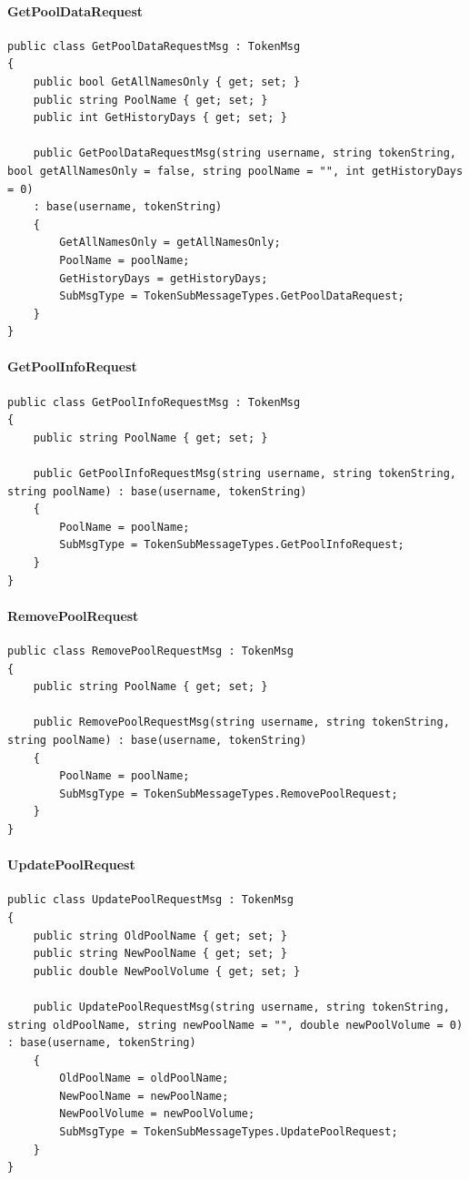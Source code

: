 \paragraph{GetPoolDataRequest}
\begin{lstlisting}[caption=GetPoolDataRequest, label=code:GetPoolDataRequest]
public class GetPoolDataRequestMsg : TokenMsg
{
	public bool GetAllNamesOnly { get; set; }
	public string PoolName { get; set; }
	public int GetHistoryDays { get; set; }
	
	public GetPoolDataRequestMsg(string username, string tokenString, bool getAllNamesOnly = false, string poolName = "", int getHistoryDays = 0)
	: base(username, tokenString)
	{
		GetAllNamesOnly = getAllNamesOnly;
		PoolName = poolName;
		GetHistoryDays = getHistoryDays;
		SubMsgType = TokenSubMessageTypes.GetPoolDataRequest;
	}
}
\end{lstlisting}

\paragraph{GetPoolInfoRequest}
\begin{lstlisting}[caption=GetPoolInfoRequest, label=code:GetPoolInfoRequest]
public class GetPoolInfoRequestMsg : TokenMsg
{
	public string PoolName { get; set; }
	
	public GetPoolInfoRequestMsg(string username, string tokenString, string poolName) : base(username, tokenString)
	{
		PoolName = poolName;
		SubMsgType = TokenSubMessageTypes.GetPoolInfoRequest;
	}
}
\end{lstlisting}

\paragraph{RemovePoolRequest}
\begin{lstlisting}[caption=RemovePoolRequest, label=code:RemovePoolRequest]
public class RemovePoolRequestMsg : TokenMsg
{
	public string PoolName { get; set; }
	
	public RemovePoolRequestMsg(string username, string tokenString, string poolName) : base(username, tokenString)
	{
		PoolName = poolName;
		SubMsgType = TokenSubMessageTypes.RemovePoolRequest;
	}
}
\end{lstlisting}

\paragraph{UpdatePoolRequest}
\begin{lstlisting}[caption=UpdatePoolRequest, label=code:UpdatePoolRequest]
public class UpdatePoolRequestMsg : TokenMsg
{
	public string OldPoolName { get; set; }
	public string NewPoolName { get; set; }
	public double NewPoolVolume { get; set; }
	
	public UpdatePoolRequestMsg(string username, string tokenString, string oldPoolName, string newPoolName = "", double newPoolVolume = 0) : base(username, tokenString)
	{
		OldPoolName = oldPoolName;
		NewPoolName = newPoolName;
		NewPoolVolume = newPoolVolume;
		SubMsgType = TokenSubMessageTypes.UpdatePoolRequest;
	}
}
\end{lstlisting}

